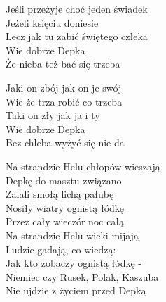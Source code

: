 \begin{text}
    \vin Jeśli przeżyje choć jeden świadek\\
    \vin Jeżeli księciu doniesie\\
    \vin Lecz jak tu zabić świętego człeka\\
    \vin Wie dobrze Depka\\
    \vin Że nieba też bać się trzeba

    \vin Jaki on zbój jak on je swój\\
    \vin Wie że trza robić co trzeba\\
    \vin Taki on zły jak ja i ty\\
    \vin Wie dobrze Depka\\
    \vin Bez chleba wyżyć się nie da

    Na strandzie Helu chłopów wieszają\\
    Depkę do masztu związano\\
    Zalali smołą lichą pałubę\\
    Nosiły wiatry ognistą łódkę\\
    Przez cały wieczór noc całą\\
    \vin Na strandzie Helu wieki mijają\\
    \vin Ludzie gadają, co wiedzą:\\
    \vin Jak kto zobaczy ognistą łódkę -\\
    \vin Niemiec czy Rusek, Polak, Kaszuba\\
    \vin Nie ujdzie z życiem przed Depką
\end{text}
\begin{chord}

\end{chord}